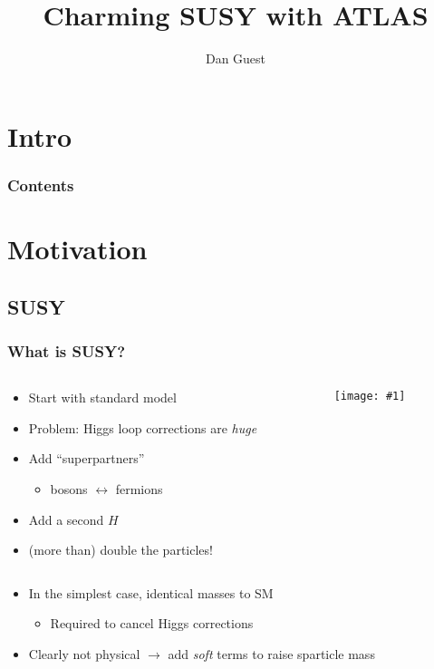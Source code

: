 \documentclass[usenames,dvipsnames]{beamer}
\title[Charmed SUSY]{Charming SUSY with ATLAS}
\author[dhg3]{Dan Guest}
\institute[Yale]{Yale University}
\newcommand{\widegraphic}[1]{\texttt{[image: \#1]}}
\begin{document}
\section*{Intro}

\maketitle
\begin{frame}
  \frametitle{Contents}
  \tableofcontents
\end{frame}


\section{Motivation}

\subsection{SUSY}
\begin{frame}
  \frametitle{What is SUSY?}
  \begin{columns}
    \begin{column}{0.5\textwidth}
      \begin{itemize}
      \item Start with standard model
      \item Problem: Higgs loop corrections are \emph{huge}
      \item Add ``superpartners''
        \begin{itemize}
          \item bosons $\leftrightarrow$ fermions
        \end{itemize}
      \item Add a second $H$
      \item (more than) double the particles!
      \end{itemize}
    \end{column}
    \begin{column}{0.5\textwidth}
      \widegraphic{figures/external/standard-model.pdf}
    \end{column}
  \end{columns}
  \begin{itemize}
  \item In the simplest case, identical masses to SM
    \begin{itemize}
    \item Required to cancel Higgs corrections
    \end{itemize}
  \item Clearly not physical $\to$ add \emph{soft} terms to raise sparticle mass
  \end{itemize}
\end{frame}
\end{document}
